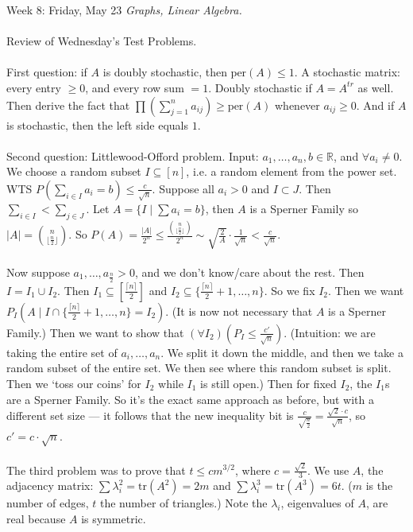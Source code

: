 \documentclass[12pt]{article}
\theoremstyle{remark}
\newcommand{\R}{\mathbb{R}}
\newcommand{\per}{\mathrm{per}}
\newcommand{\tr}{\mathrm{tr}}
\begin{document}
\newpage

\label{24}\begin{section}{Week 8: Friday, May 23}
\indent\textit{Graphs, Linear Algebra.}\\\\
Review of Wednesday's Test Problems. 
\\\\
First question: if $A$ is doubly stochastic, then $\per(A) \leq 1$. A stochastic matrix: every entry $ \geq 0$, and every row sum $ = 1$. Doubly stochastic if $A = A^{tr}$ as well. Then derive the fact that $\prod(\sum_{j=1}^n a_{ij}) \geq \per(A)$ whenever $a_{ij} \geq 0$. And if $A$ is stochastic, then the left side equals $1$.
\\\\
Second question: Littlewood-Offord problem. Input: $a_1,\ldots,a_n,b \in \R$, and $\forall a_i \neq 0$. We choose a random subset $I \subseteq [n]$, i.e. a random element from the power set. WTS $P(\sum_{i \in I} a_i = b) \leq \frac{c}{\sqrt n}$. Suppose all $a_i > 0$ and $I \subset J$. Then $\sum_{i \in I} < \sum_{j \in J}$. Let $A = \{I \mid \sum a_i = b\}$, then $A$ is a Sperner Family so $|A| = {n \choose {\lfloor \frac n 2 \rfloor}}$. So $P(A) = \frac{|A|}{2^n} \leq \frac{{n \choose {\lfloor \frac n 2 \rfloor}}}{2^n} \sim \sqrt{\frac 2 A } \cdot \frac 1 {\sqrt{n}} < \frac c {\sqrt{n}}$.
\\\\
Now suppose $a_1,\ldots, a_{\frac n 2} > 0$, and we don't know/care about the rest. Then $I = I_1 \cup I_2$. Then $I_1 \subseteq [\frac{\lceil n \rceil}{2}]$ and $I_2 \subseteq \{ \frac{\lceil n \rceil}{2} +1,\ldots, n\}$. So we fix $I_2$. Then we want $P_I(A \mid I \cap \{\frac{\lceil n \rceil}{2} + 1, \ldots, n\} = I_2)$. (It is now not necessary that $A$ is a Sperner Family.) Then we want to show that $(\forall I_2)(P_I \leq \frac{c'}{\sqrt{n}})$. (Intuition: we are taking the entire set of $a_i,\ldots,a_n$. We split it down the middle, and then we take a random subset of the entire set. We then see where this random subset is split. Then we `toss our coins' for $I_2$ while $I_1$ is still open.) Then for fixed $I_2$, the $I_1$s are a Sperner Family. So it's the exact same approach as before, but with a different set size --- it follows that the new inequality bit is $\frac{c}{\sqrt{\frac n 2}} = \frac{\sqrt 2 \cdot c}{\sqrt n}$, so $c ' = c \cdot \sqrt{n}$.
\\\\
The third problem was to prove that $t \leq cm^{3/2}$, where $c =\frac{ \sqrt{2}}{3}$. We use $A$, the adjacency matrix: $\sum \lambda_i^2 = \tr(A^2) = 2m$ and $\sum \lambda_i^3 = \tr (A^3) = 6t$. ($m$ is the number of edges, $t$ the number of triangles.) Note the $\lambda_i$, eigenvalues of $A$, are real because $A$ is symmetric.

\end{section}
\end{document}
